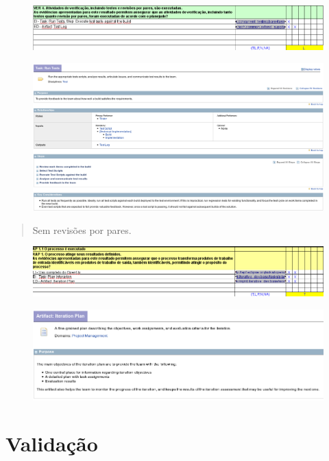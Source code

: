 \begin{frame}
\begin{figure}[p]
    \centering
    \includegraphics[width=\textwidth]{conteudo/VER4-run_tests}
    \label{fig:Pattern}
\end{figure}	
\end{frame}
\begin{frame}
\begin{figure}[p]
    \centering
    \includegraphics[width=\textwidth]{conteudo/task-run_tests}
    \label{fig:Pattern}
\end{figure}	
\begin{quote}
Sem revisões por pares.
\end{quote}
\end{frame}


\begin{frame}
\begin{figure}[p]
    \centering
    \includegraphics[width=\textwidth]{conteudo/RAP1}
    \label{fig:Pattern}
\end{figure}	
\end{frame}
\begin{frame}
\begin{figure}[p]
    \centering
    \includegraphics[width=\textwidth]{conteudo/plan}
    \label{fig:Pattern}
\end{figure}	
\begin{quote}
\end{quote}
\end{frame}

\section{Validação} %
\label{sec:valida_o}

